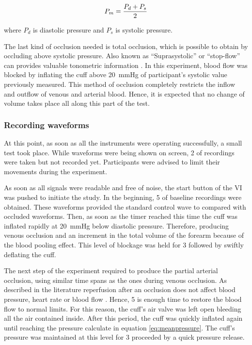 \begin{align}
	\label{eq:meanpressure}
	P_m = \frac{P_d + P_s}{2} \tagaddtext{[\si{\mmHg}]}
\end{align}

where $P_d$ is diastolic pressure and $P_s$ is systolic pressure. 

The last kind of occlusion needed is total occlusion, which is possible to obtain by occluding above systolic pressure. Also known as  “Suprasystolic” or “stop-flow” can provides valuable tonometric information \cite{lowe2009non}. In this experiment, blood flow was blocked by inflating the cuff above \SI{20}{\mmHg} of participant's systolic value previously measured. This method of occlusion completely restricts the inflow and outflow of venous and arterial blood. Hence, it is expected that no change of volume takes place all along this part of the test.

\subsubsection{Recording waveforms}

At this point, as soon as all the instruments were operating successfully, a small test took place. While waveforms were being shown on screen, \SI{2}{\min} of recordings were taken but not recorded yet. Participants were advised to limit their movements during the experiment. 

As soon as all signals were readable and free of noise, the start button of the VI was pushed to initiate the study. In the beginning, \SI{5}{\min} of baseline recordings were obtained. These waveforms provided the standard control wave to compared with occluded waveforms. Then, as soon as the timer reached this time the cuff was inflated rapidly at \SI{20}{\mmHg} below diastolic pressure. Therefore, producing venous occlusion and an increment in the total volume of the forearm because of the blood pooling effect. This level of blockage was held for \SI{3}{\min} followed by swiftly deflating the cuff. 

The next step of the experiment required to produce the partial arterial occlusion, using similar time spans as the ones during venous occlusion. As described in the literature reperfusion after an occlusion does not affect blood pressure, heart rate or blood flow \cite{kharbanda2002transient}. Hence, \SI{5}{\min} is enough time  to restore the blood flow to normal limits. For this reason, the cuff's air valve was left open bleeding all the air contained inside. After this period, the cuff was quickly inflated again until reaching the pressure calculate in equation \ref{eq:meanpressure}. The cuff's pressure was maintained at this level for \SI{3}{\min} proceeded by a quick pressure release. 

